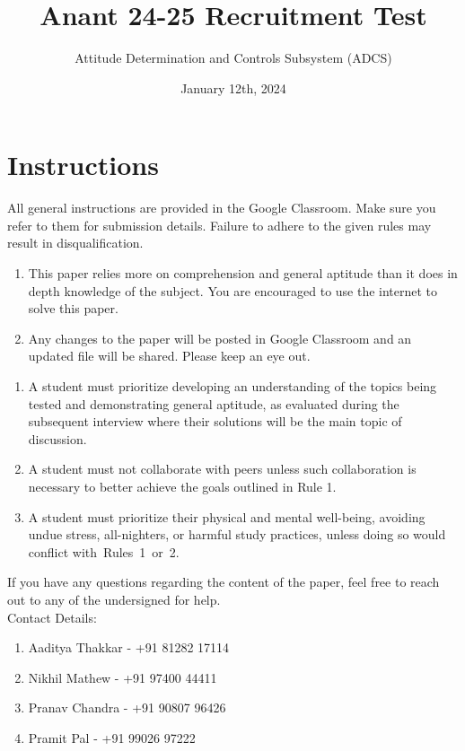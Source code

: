 \documentclass[a4paper, 12pt]{exam}
\begin{document}
	\title{Anant 24-25 Recruitment Test}
	\author{Attitude Determination and Controls Subsystem (ADCS)}
	\date{January 12th, 2024}
	\maketitle
	
	\section*{Instructions}
	All general instructions are provided in the Google Classroom. Make sure you refer to them for submission details. Failure to adhere to the given rules may result in disqualification. 
	\begin{enumerate}[]
		\item This paper relies more on comprehension and general aptitude than it does in depth knowledge of the subject. You are encouraged to use the internet to solve this paper.
		\item Any changes to the paper will be posted in Google Classroom and an updated file will be shared. Please keep an eye out.
	\end{enumerate} 
	
	\bigskip

	\begin{enumerate}[label = \textbf{Rule \arabic* }:, leftmargin=5em]
		\item A student must prioritize developing an understanding of the topics being tested and demonstrating general aptitude, as evaluated during the subsequent interview where their solutions will be the main topic of discussion.
		
		\item A student must not collaborate with peers unless such collaboration is necessary to better achieve the goals outlined in Rule 1.
		
		\item A student must prioritize their physical and mental well-being, avoiding undue stress, all-nighters, or harmful study practices, unless doing so would conflict with Rules 1 or 2.
		
			\end{enumerate}
		
If you have any questions regarding the content of the paper, feel free to reach out to any of the undersigned for help. \\

Contact Details:
		\begin{enumerate}
			\item Aaditya Thakkar - +91 81282 17114
			\item Nikhil Mathew - +91 97400 44411
			\item Pranav Chandra - +91 90807 96426
			\item Pramit Pal - +91 99026 97222
		\end{enumerate}
\end{document}
